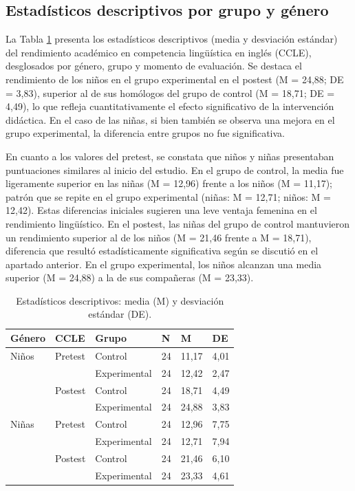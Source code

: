 \documentclass[spanish]{textolivre}
\begin{document}
\subsection{Estadísticos descriptivos por grupo y género}
La Tabla \ref{tab-5} presenta los estadísticos descriptivos (media y desviación estándar) del rendimiento académico en competencia lingüística en inglés (CCLE), desglosados por género, grupo y momento de evaluación. Se destaca el rendimiento de los niños en el grupo experimental en el postest (M = 24,88; DE = 3,83), superior al de sus homólogos del grupo de control (M = 18,71; DE = 4,49), lo que refleja cuantitativamente el efecto significativo de la intervención didáctica. En el caso de las niñas, si bien también se observa una mejora en el grupo experimental, la diferencia entre grupos no fue significativa.

En cuanto a los valores del pretest, se constata que niños y niñas presentaban puntuaciones similares al inicio del estudio. En el grupo de control, la media fue ligeramente superior en las niñas (M = 12,96) frente a los niños (M = 11,17); patrón que se repite en el grupo experimental (niñas: M = 12,71; niños: M = 12,42). Estas diferencias iniciales sugieren una leve ventaja femenina en el rendimiento lingüístico. En el postest, las niñas del grupo de control mantuvieron un rendimiento superior al de los niños (M = 21,46 frente a M = 18,71), diferencia que resultó estadísticamente significativa según se discutió en el apartado anterior. En el grupo experimental, los niños alcanzan una media superior (M = 24,88) a la de sus compañeras (M = 23,33).

\begin{table}[h!]
\centering
\begin{threeparttable}
\caption{Estadísticos descriptivos: media (M) y desviación estándar (DE).}\label{tab-5}
\begin{tabular}{p{1.3cm}p{1.5cm}p{2.5cm}p{1cm}p{1cm}p{0.8cm}}
\toprule
Género & CCLE & Grupo & N & M & DE \\
\midrule
Niños & Pretest & Control & 24 & 11,17 & 4,01 \\
& & Experimental & 24 & 12,42 & 2,47 \\
& Postest & Control & 24 & 18,71 & 4,49 \\
& & Experimental & 24 & 24,88 & 3,83 \\

\addlinespace

Niñas & Pretest & Control & 24 & 12,96 & 7,75 \\
& & Experimental & 24 & 12,71 & 7,94 \\
& Postest & Control & 24 & 21,46 & 6,10 \\
& & Experimental & 24 & 23,33 & 4,61 \\
\bottomrule
\end{tabular}
\end{threeparttable}
\end{table}
\end{document}
